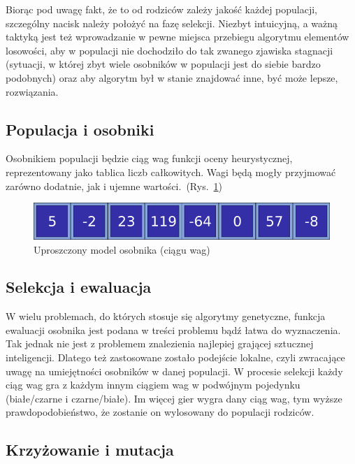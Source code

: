 Biorąc pod uwagę fakt, że to od rodziców zależy jakość każdej populacji, szczególny nacisk należy położyć na fazę selekcji. Niezbyt intuicyjną, a ważną taktyką jest też wprowadzanie w pewne miejsca przebiegu algorytmu elementów losowości, aby w populacji nie dochodziło do tak zwanego zjawiska stagnacji (sytuacji, w której zbyt wiele osobników w populacji jest do siebie bardzo podobnych) oraz aby algorytm był w stanie znajdować inne, być może lepsze, rozwiązania.

\subsection{Populacja i osobniki}

Osobnikiem populacji będzie ciąg wag funkcji oceny heurystycznej, reprezentowany jako tablica liczb całkowitych. Wagi będą mogły przyjmować zarówno dodatnie, jak i ujemne wartości.~(Rys.~\ref{fig:osobnik})

\begin{figure}
    \centering
    \includegraphics[scale=.6]{graphics/genetyk_osobnik.png}
    \caption{Uproszczony model osobnika (ciągu wag)}
    \label{fig:osobnik}
\end{figure}

\subsection{Selekcja i ewaluacja}

W wielu problemach, do których stosuje się algorytmy genetyczne, funkcja ewaluacji osobnika jest podana w treści problemu bądź łatwa do wyznaczenia. Tak jednak nie jest z problemem znalezienia najlepiej grającej sztucznej inteligencji. Dlatego też zastosowane zostało podejście lokalne, czyli zwracające uwagę na umiejętności osobników w danej populacji. W procesie selekcji każdy ciąg wag gra z każdym innym ciągiem wag w podwójnym pojedynku (białe/czarne i czarne/białe). Im więcej gier wygra dany ciąg wag, tym wyższe prawdopodobieństwo, że zostanie on wylosowany do populacji rodziców.

\subsection{Krzyżowanie i mutacja}

